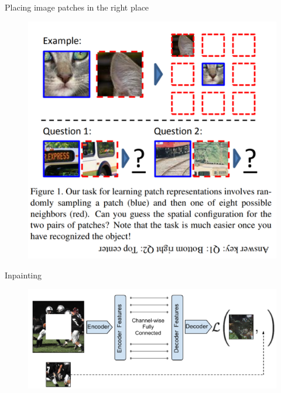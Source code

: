 \documentclass{beamer}
\begin{document}
	\begin{frame}{Placing image patches in the right place}\vspace{4pt}
		\begin{figure}
			\centering
			\includegraphics[scale=1]{placing.png}
		\end{figure}
	\end{frame}

	\begin{frame}{Inpainting}\vspace{4pt}
		\begin{figure}
			\centering
			\includegraphics[scale=1]{inpainting.png}
		\end{figure}
	\end{frame}
\end{document}

